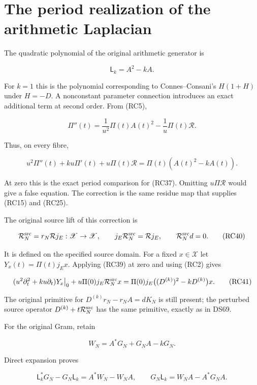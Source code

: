 \documentclass[
  11pt,
]{article}
\begin{document}
\section{The period realization of the arithmetic
Laplacian}\label{the-period-realization-of-the-arithmetic-laplacian}

The quadratic polynomial of the original arithmetic generator is

\[
\mathsf L_k=A^2-kA.
\tag{RC37}
\]

For \(k=1\) this is the polynomial corresponding to Connes--Consani's
\(H(1+H)\) under \(H=-D\). A nonconstant parameter connection introduces
an exact additional term at second order. From (RC5),

\[
\Pi''(t)=\frac1{u^2}\Pi(t)A(t)^2
-\frac1u\Pi(t)\mathcal R.
\tag{RC38}
\]

Thus, on every fibre,

\[
\boxed{u^2\Pi''(t)+ku\Pi'(t)+u\Pi(t)\mathcal R
=\Pi(t)(A(t)^2-kA(t)).}
\tag{RC39}
\]

At zero this is the exact period comparison for (RC37). Omitting
\(u\Pi\mathcal R\) would give a false equation. The correction is the
same residue map that supplies (RC15) and (RC25).

The original source lift of this correction is

\[
\mathcal R_N^{\rm src}=r_N\mathcal Rj_E:\mathscr X\to\mathscr X,
\qquad j_E\mathcal R_N^{\rm src}=\mathcal Rj_E,
\qquad \mathcal R_N^{\rm src}d=0.
\tag{RC40}
\]

It is defined on the specified source domain. For a fixed
\(x\in\mathscr X\) let \(Y_x(t)=\Pi(t)j_Ex\). Applying (RC39) at zero
and using (RC2) gives

\[
\begin{split}
\left.(u^2\partial_t^2+ku\partial_t)Y_x\right|_{0}
+u\Pi(0)j_E\mathcal R_N^{\rm src}x
=\Pi(0)j_E\bigl((D^{(k)})^2-kD^{(k)}\bigr)x.
\end{split}
\tag{RC41}
\]

The original primitive for \(D^{(k)}r_N-r_NA=dK_N\) is still present;
the perturbed source operator \(D^{(k)}+t\mathcal R_N^{\rm src}\) has
the same primitive, exactly as in DS69.

For the original Gram, retain

\[
W_N=A^*G_N+G_NA-kG_N.
\tag{RC42}
\]

Direct expansion proves

\[
\mathsf L_k^*G_N-G_N\mathsf L_k=A^*W_N-W_NA,
\qquad G_N\mathsf L_k=W_NA-A^*G_NA.
\tag{RC43}
\]
\end{document}
